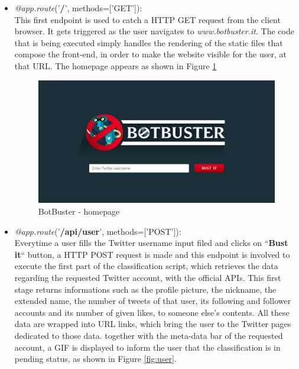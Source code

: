 \begin{itemize}
	\item[\PencilRight] \textit{@app.route}('\textbf{/}', methods=['GET']):\\
	This first endpoint is used to catch a HTTP GET request from the client browser.
	It gets triggered as the user navigates to \textit{www.botbuster.it}. The code that is being executed simply handles the rendering of the static files that compose the front-end, in order to make the website visible for the user, at that URL. The homepage appears as shown in Figure \ref{fig:homepage}
	\begin{figure}[htp!]
		\begin{center}
			\includegraphics[width=\columnwidth]{chapter7/figure/homepage.png}\par 
		\end{center}
		\caption{BotBuster - homepage}
		\label{fig:homepage}
	\end{figure}
	\item[\PencilRight] \textit{@app.route}('\textbf{/api/user}', methods=['POST']):\\
	 Everytime a user fills the Twitter username input filed and clicks on ``\textbf{Bust it}`` button, a HTTP POST request is made and this endpoint is involved to execute the first part of the classification script, which retrieves the data regarding the requested Twitter account, with the official APIs. This first stage returns informations such as the profile picture, the nickname, the extended name, the number of tweets of that user, its following and follower accounts and its number of given likes, to someone else's contents.
	 All these data are wrapped into URL links, which bring the user to the Twitter pages dedicated to those data. together with the meta-data bar of the requested account, a GIF is displayed to inform the user that the classification is in pending status, as shown in Figure \ref{fig:user}.

\end{itemize}

